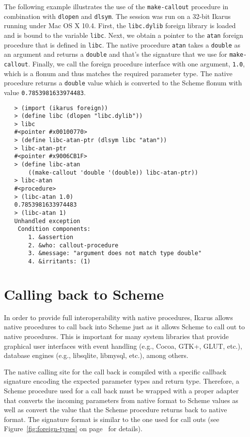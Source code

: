 \documentclass[onecolumn, 12pt, twoside, openright, dvipdfm]{book}
\begin{document}
The following example illustrates the use of the
\texttt{make-callout} procedure in combination with \texttt{dlopen}
and \texttt{dlsym}.  The session was run on a 32-bit Ikarus running
under Mac OS X 10.4.  First, the \texttt{libc.dylib} foreign library
is loaded and is bound to the variable \texttt{libc}.  Next, we
obtain a pointer to the \texttt{atan} foreign procedure that is
defined in \texttt{libc}.  The native procedure \texttt{atan} takes
a \texttt{double} as an argument and returns a \texttt{double} and
that's the signature that we use for \texttt{make-callout}.
Finally, we call the foreign procedure interface with one argument,
\texttt{1.0}, which is a flonum and thus matches the required
parameter type.  The native procedure returns a \texttt{double}
value which is converted to the Scheme flonum with value
\texttt{0.7853981633974483}.

\begin{verbatim}
   > (import (ikarus foreign))
   > (define libc (dlopen "libc.dylib"))
   > libc
   #<pointer #x00100770>
   > (define libc-atan-ptr (dlsym libc "atan"))
   > libc-atan-ptr
   #<pointer #x9006CB1F>
   > (define libc-atan 
       ((make-callout 'double '(double)) libc-atan-ptr))
   > libc-atan
   #<procedure>
   > (libc-atan 1.0)
   0.7853981633974483
   > (libc-atan 1)
   Unhandled exception
    Condition components:
       1. &assertion
       2. &who: callout-procedure
       3. &message: "argument does not match type double"
       4. &irritants: (1)
\end{verbatim}


\section{\label{sec:callback}Calling back to Scheme}

In order to provide full interoperability with native procedures,
Ikarus allows native procedures to call back into Scheme just as it
allows Scheme to call out to native procedures.  This is important
for many system libraries that provide graphical user interfaces
with event handling (e.g., Cocoa, GTK+, GLUT, etc.), database
engines (e.g., libsqlite, libmysql, etc.), among others.

The native calling site for the call back is compiled with a
specific callback signature encoding the expected parameter types
and return type.  Therefore, a Scheme procedure used for a call back
must be wrapped with a proper adapter that converts the incoming
parameters from native format to Scheme values as well as convert
the value that the Scheme procedure returns back to native format.
The signature format is similar to the one used for call outs (see
Figure~\ref{fig:foreign-types} on page~\pageref{fig:foreign-types} for
details).
\end{document}
